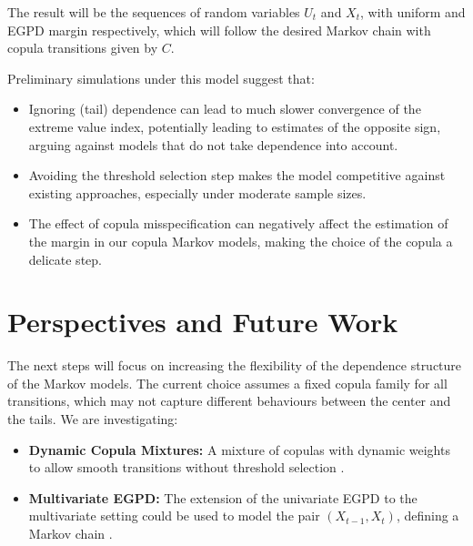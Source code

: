 \documentclass[11pt, a4paper]{article}
\begin{document}
The result will be the sequences of random variables $U_t$ and $X_t$, with uniform and EGPD margin respectively, which will follow the desired Markov chain with copula transitions given by $C$.

Preliminary simulations under this model suggest that:

\begin{itemize}
    \item Ignoring (tail) dependence can lead to much slower convergence of the extreme value index, potentially leading to estimates of the opposite sign, arguing against models that do not take dependence into account.
    \item Avoiding the threshold selection step makes the model competitive against existing approaches, especially under moderate sample sizes.
    \item The effect of copula misspecification can negatively affect the estimation of the margin in our copula Markov models, making the choice of the copula a delicate step.
\end{itemize}

\section{Perspectives and Future Work}
The next steps will focus on increasing the flexibility of the dependence structure of the Markov models. The current choice assumes a fixed copula family for all transitions, which may not capture different behaviours between the center and the tails. We are investigating:
\begin{itemize}
    \item \textbf{Dynamic Copula Mixtures:} A mixture of copulas with dynamic weights to allow smooth transitions without threshold selection \parencite{andre2024}.
    \item \textbf{Multivariate EGPD:} The extension of the univariate EGPD to the multivariate setting could be used to model the pair $(X_{t-1}, X_t)$, defining a Markov chain \parencite{gaetan2025}.
\end{itemize}

\printbibliography
\end{document}
